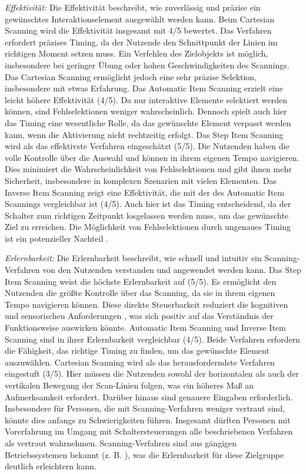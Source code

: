 \textit{Effektivität:}
Die Effektivität beschreibt, wie zuverlässig und präzise ein gewünschtes Interaktionselement ausgewählt werden kann. Beim Cartesian Scanning wird die Effektivität insgesamt mit 4/5 bewertet. Das Verfahren erfordert präzises Timing, da der Nutzende den Schnittpunkt der Linien im richtigen Moment setzen muss. Ein Verfehlen des Zielobjekts ist möglich, insbesondere bei geringer Übung oder hohen Geschwindigkeiten des Scannings. Das Cartesian Scanning ermöglicht jedoch eine sehr präzise Selektion, insbesondere mit etwas Erfahrung. 
Das Automatic Item Scanning erzielt eine leicht höhere Effektivität (4/5). Da nur interaktive Elemente selektiert werden können, sind Fehlselektionen weniger wahrscheinlich. Dennoch spielt auch hier das Timing eine wesentliche Rolle, da das gewünschte Element verpasst werden kann, wenn die Aktivierung nicht rechtzeitig erfolgt. Das Step Item Scanning wird als das effektivste Verfahren eingeschätzt (5/5). Die Nutzenden haben die volle Kontrolle über die Auswahl und können in ihrem eigenen Tempo navigieren. Dies minimiert die Wahrscheinlichkeit von Fehlselektionen und gibt ihnen mehr Sicherheit, insbesondere in komplexen Szenarien mit vielen Elementen. Das Inverse Item Scanning zeigt eine Effektivität, die mit der des Automatic Item Scannings vergleichbar ist (4/5). Auch hier ist das Timing entscheidend, da der Schalter zum richtigen Zeitpunkt losgelassen werden muss, um das gewünschte Ziel zu erreichen. Die Möglichkeit von Fehlselektionen durch ungenaues Timing ist ein potenzieller Nachteil \citep{COOK2015117}.

\textit{Erlernbarkeit:}
Die Erlernbarkeit beschreibt, wie schnell und intuitiv ein Scanning-Verfahren von den Nutzenden verstanden und angewendet werden kann. Das Step Item Scanning weist die höchste Erlernbarkeit auf (5/5). Es ermöglicht den Nutzenden die größte Kontrolle über das Scanning, da sie in ihrem eigenen Tempo navigieren können. Diese direkte Steuerbarkeit reduziert die kognitiven und sensorischen Anforderungen \citep{cook_chapter_2015}, was sich positiv auf das Verständnis der Funktionsweise auswirken könnte. Automatic Item Scanning und Inverse Item Scanning sind in ihrer Erlernbarkeit vergleichbar (4/5). Beide Verfahren erfordern die Fähigkeit, das richtige Timing zu finden, um das gewünschte Element auszuwählen. Cartesian Scanning wird als das herausforderndste Verfahren eingestuft (3/5). Hier müssen die Nutzenden sowohl der horizontalen als auch der vertikalen Bewegung der Scan-Linien folgen, was ein höheres Maß an Aufmerksamkeit erfordert. Darüber hinaus sind genauere Eingaben erforderlich. Insbesondere für Personen, die mit Scanning-Verfahren weniger vertraut sind, könnte dies anfangs zu Schwierigkeiten führen.
Insgesamt dürften Personen mit Vorerfahrung im Umgang mit Schaltersteuerungen alle beschriebenen Verfahren als vertraut wahrnehmen. Scanning-Verfahren sind aus gängigen Betriebssystemen bekannt (z. B. \citep{apple_einfuhrung_2024, Google-Switch-Access}), was die Erlernbarkeit für diese Zielgruppe deutlich erleichtern kann.

